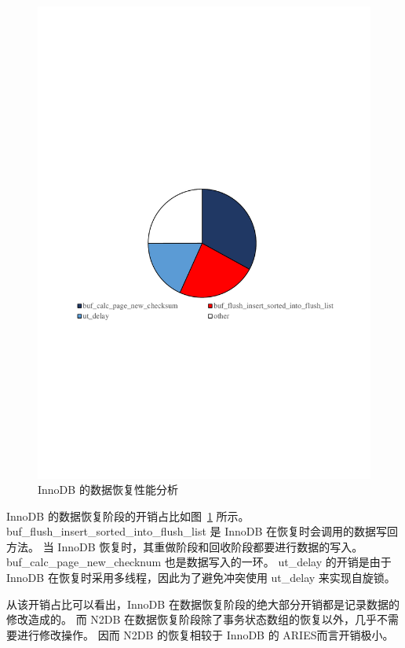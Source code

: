 \begin{figure}
    \centering
    \includegraphics[width=15cm, trim={1cm 9cm 1cm 10cm}]{figures/innodb-recovery-perf.pdf}
    \caption{InnoDB 的数据恢复性能分析}
    \label{fig:recovery-innodb-perf}
\end{figure}


InnoDB 的数据恢复阶段的开销占比如图~\ref{fig:recovery-innodb-perf} 所示。
buf\_flush\_insert\_sorted\_into\_flush\_list 是 InnoDB 在恢复时会调用的数据写回方法。
当 InnoDB 恢复时，其重做阶段和回收阶段都要进行数据的写入。
buf\_calc\_page\_new\_checknum 也是数据写入的一环。
ut\_delay 的开销是由于 InnoDB 在恢复时采用多线程，因此为了避免冲突使用 ut\_delay 来实现自旋锁。

从该开销占比可以看出，InnoDB 在数据恢复阶段的绝大部分开销都是记录数据的修改造成的。
而 N2DB 在数据恢复阶段除了事务状态数组的恢复以外，几乎不需要进行修改操作。
因而 N2DB 的恢复相较于 InnoDB 的 ARIES而言开销极小。








